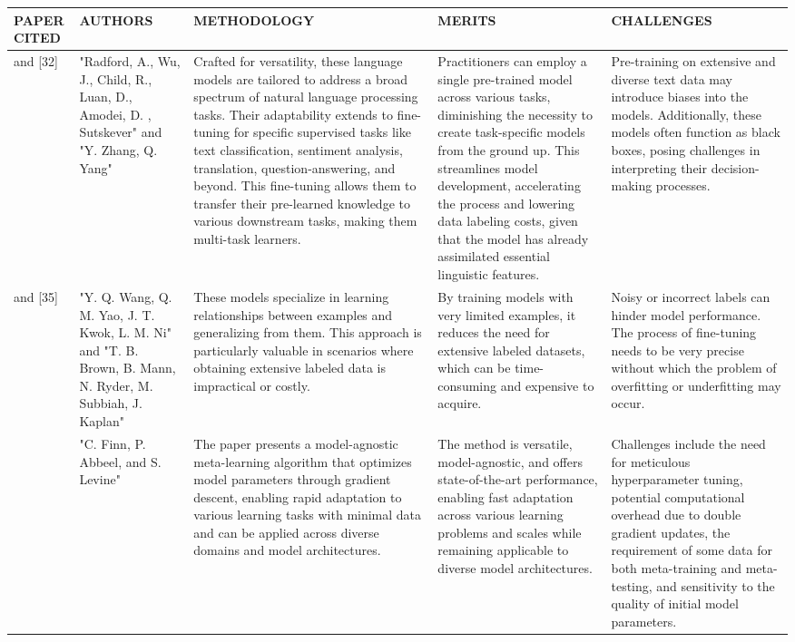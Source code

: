 \documentclass[fleqn,10pt]{thescipub} %
\begin{document}
\begin{table}
\begin{center}
 \centering
  \small %
    \begin{tabular}{ |p{1cm}|p{2cm}|p{4cm}|p{4cm}|p{4cm}| }
\hline
\centering PAPER CITED & \centering  AUTHORS & \centering METHODOLOGY &  \centering MERITS &  \centering CHALLENGES \arraybackslash \\ 
\hline
[31] and [32] & "Radford, A., Wu, J., Child, R., Luan, D., Amodei, D. , Sutskever" and "Y. Zhang, Q. Yang" & Crafted for versatility, these language models are tailored to address a broad spectrum of natural language processing tasks. Their adaptability extends to fine-tuning for specific supervised tasks like text classification, sentiment analysis, translation, question-answering, and beyond. This fine-tuning allows them to transfer their pre-learned knowledge to various downstream tasks, making them multi-task learners. & Practitioners can employ a single pre-trained model across various tasks, diminishing the necessity to create task-specific models from the ground up. This streamlines model development, accelerating the process and lowering data labeling costs, given that the model has already assimilated essential linguistic features. & Pre-training on extensive and diverse text data may introduce biases into the models. Additionally, these models often function as black boxes, posing challenges in interpreting their decision-making processes. \\
\hline
[33] and [35]  & "Y. Q. Wang, Q. M. Yao, J. T. Kwok, L. M. Ni" and "T. B. Brown, B. Mann, N. Ryder, M. Subbiah, J. Kaplan" & These models specialize in learning relationships between examples and generalizing from them. This approach is particularly valuable in scenarios where obtaining extensive labeled data is impractical or costly. & By training models with very limited examples, it reduces the need for extensive labeled datasets, which can be time-consuming and expensive to acquire. & Noisy or incorrect labels can hinder model performance. The process of fine-tuning needs to be very precise without which the problem of overfitting or underfitting may occur. \\
\hline
[36]  & "C. Finn, P. Abbeel, and S. Levine" & The paper presents a model-agnostic meta-learning algorithm that optimizes model parameters through gradient descent, enabling rapid adaptation to various learning tasks with minimal data and can be applied across diverse domains and model architectures. & The method is versatile, model-agnostic, and offers state-of-the-art performance, enabling fast adaptation across various learning problems and scales while remaining applicable to diverse model architectures. & Challenges include the need for meticulous hyperparameter tuning, potential computational overhead due to double gradient updates, the requirement of some data for both meta-training and meta-testing, and sensitivity to the quality of initial model parameters. \\

\end{tabular}
\end{center}
\end{table}
\end{document}
